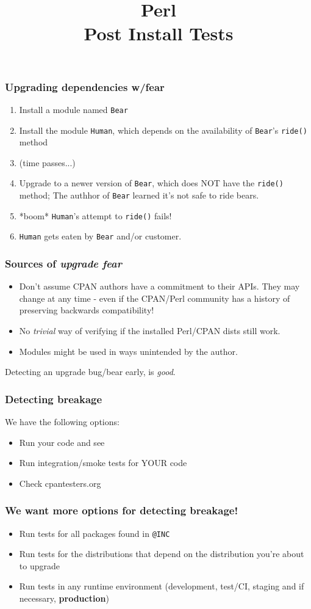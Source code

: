 \documentclass[10pt]{beamer}
\title{Perl \\ Post Install Tests}
\begin{document}
\begin{frame}
\titlepage
\end{frame}


\begin{frame}[fragile]
\frametitle{Upgrading dependencies w/fear}
\begin{enumerate}
  \item Install a module named \verb|Bear|
  \item Install the module \verb|Human|, which depends on the availability of \verb|Bear|'s \verb|ride()| method
  \item (time passes...)
  \item Upgrade to a newer version of \verb|Bear|, which does NOT have the \verb|ride()| method; The authhor of \verb|Bear| learned it's not safe to ride bears.
  \item *boom* \verb|Human|'s attempt to \verb|ride()| fails!
  \item \verb|Human| gets eaten by \verb|Bear| and/or customer.
\end{enumerate}
\end{frame}

\begin{frame}
\frametitle{Sources of \emph{upgrade fear}}
\begin{itemize}
  \item Don't assume CPAN authors have a commitment to their APIs. They may change at any time - even if the CPAN/Perl community has a history of preserving backwards compatibility!
  \item No \emph{trivial} way of verifying if the installed Perl/CPAN dists still work.
  \item Modules might be used in ways unintended by the author.
\end{itemize}
Detecting an upgrade bug/bear early, is \emph{good}.
\end{frame}

\begin{frame}[fragile]
\frametitle{Detecting breakage}
We have the following options:
\begin{itemize}
\item Run your code and see
\item Run integration/smoke tests for YOUR code
\item Check cpantesters.org
\end{itemize}
\end{frame}

\begin{frame}[fragile]
\frametitle{We want more options for detecting breakage!}
\begin{itemize}
\item Run tests for all packages found in \verb|@INC|
\item Run tests for the distributions that depend on the distribution you're about to upgrade
\item Run tests in any runtime environment (development, test/CI, staging and if necessary, {\bf production})
\end{itemize}
\end{frame}
\end{document}
